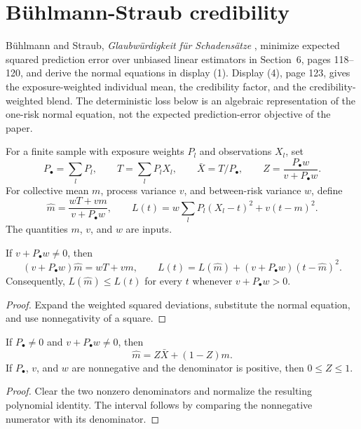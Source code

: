 \chapter{Bühlmann-Straub credibility}

Bühlmann and Straub, \emph{Glaubwürdigkeit für Schadensätze} \cite{BuhlmannStraub1970}, minimize expected squared
prediction error over unbiased linear estimators in Section~6, pages 118--120, and derive the
normal equations in display (1). Display (4), page 123, gives the exposure-weighted individual
mean, the credibility factor, and the credibility-weighted blend. The deterministic loss below
is an algebraic representation of the one-risk normal equation, not the expected
prediction-error objective of the paper.

\begin{definition}\label{def:bs}\leanok
For a finite sample with exposure weights $P_l$ and observations $X_l$, set
\[
  P_\bullet=\sum_l P_l,\qquad T=\sum_l P_lX_l,\qquad \bar X=T/P_\bullet,
  \qquad Z=\frac{P_\bullet w}{v+P_\bullet w}.
\]
For collective mean $m$, process variance $v$, and between-risk variance $w$, define
\[
  \widehat m=\frac{wT+vm}{v+P_\bullet w},\qquad
  L(t)=w\sum_lP_l(X_l-t)^2+v(t-m)^2.
\]
The quantities $m$, $v$, and $w$ are inputs.
\end{definition}

\begin{theorem}\label{thm:bsMinimizer}\leanok
{}
If $v+P_\bullet w\ne0$, then
\[
  (v+P_\bullet w)\widehat m=wT+vm,
  \qquad L(t)=L(\widehat m)+(v+P_\bullet w)(t-\widehat m)^2.
\]
Consequently, $L(\widehat m)\le L(t)$ for every $t$ whenever $v+P_\bullet w>0$.
\end{theorem}
\begin{proof}\leanok Expand the weighted squared deviations, substitute the normal equation,
and use nonnegativity of a square. \end{proof}

\begin{theorem}\label{thm:bsCredibility}\leanok
{}
If $P_\bullet\ne0$ and $v+P_\bullet w\ne0$, then
\[
  \widehat m=Z\bar X+(1-Z)m.
\]
If $P_\bullet$, $v$, and $w$ are nonnegative and the denominator is positive, then
$0\le Z\le1$.
\end{theorem}
\begin{proof}\leanok Clear the two nonzero denominators and normalize the resulting polynomial
identity. The interval follows by comparing the nonnegative numerator with its denominator.
\end{proof}
